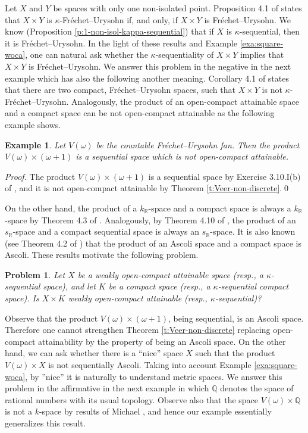 \documentclass[preprint,11pt]{elsarticle}
\newtheorem{example}[theorem]{Example}
\newtheorem{problem}[theorem]{Problem}
\numberwithin{equation}{section}
\numberwithin{theorem}{section}
\newcommand{\w}{\omega}
\newcommand{\IR}{\mathbb{R}}
\begin{document}
Let $X$ and $Y$ be spaces with only one non-isolated point. Proposition 4.1 of \cite{LiL} states that $X\times Y$ is $\kappa$-Fr\'{e}chet--Urysohn if, and only, if $X\times Y$ is Fr\'{e}chet--Urysohn. We know (Proposition \ref{p:1-non-isol-kappa-sequential}) that if $X$ is $\kappa$-sequential, then it is Fr\'{e}chet--Urysohn. In the light of these results and Example \ref{exa:square-woca}, one can natural ask whether the $\kappa$-sequentiality of $X\times Y$ implies that $X\times Y$ is Fr\'{e}chet--Urysohn. We answer this problem in the negative in the next example which has also the following another meaning. Corollary 4.1 of \cite{LiL} states that there are two compact,  Fr\'{e}chet--Urysohn spaces, such that $X\times Y$ is not $\kappa$-Fr\'{e}chet--Urysohn.
Analogously, the product of an open-compact attainable space and a compact space can be not open-compact attainable as the following example shows.

\begin{example} \label{exa:product-V-S-non-oca}
Let $V(\w)$ be the countable Fr\'{e}chet--Urysohn fan. Then the product $V(\w)\times (\w+1)$ is a sequential space which is not open-compact attainable.
\end{example}

\begin{proof}
The product $V(\w)\times (\w+1)$ is a sequential space by Exercise 3.10.I(b) of \cite{Eng}, and it is  not open-compact attainable by Theorem \ref{t:Veer-non-discrete}.\qed
\end{proof}

On the other hand, the product of a $k_\IR$-space and a compact space is always a $k_\IR$-space by Theorem 4.3 of \cite{GR-prod}. Analogously, by Theorem 4.10 of \cite{GR-prod}, the product of an $s_\IR$-space and a compact sequential space is always an $s_\IR$-space. It is also known (see Theorem 4.2 of \cite{Gabr-seq-Ascoli}) that the product of an Ascoli space and a compact space is Ascoli. These results motivate the following problem.

\begin{problem}
Let $X$ be a weakly open-compact attainable space (resp., a $\kappa$-sequential space), and let $K$ be a compact space (resp., a $\kappa$-sequential compact space). Is $X\times K$  weakly open-compact attainable  (resp., $\kappa$-sequential)?
\end{problem}



Observe that the product $V(\w)\times (\w+1)$, being sequential, is an Ascoli space. Therefore one cannot strengthen Theorem \ref{t:Veer-non-discrete} replacing open-compact attainability by the property of being an Ascoli space. On the other hand, we can ask whether there is a ``nice'' space $X$ such that the product $V(\w)\times X$ is not sequentially Ascoli. Taking into account Example \ref{exa:square-woca}, by ''nice'' it is naturally to understand metric spaces. We answer this problem in the affirmative in the next example in which $\mathbb{Q}$ denotes the space of rational numbers with its usual topology. Observe also that the space $V(\w)\times \mathbb{Q}$ is not a $k$-space by results of Michael \cite{Michael-68}, and hence  our example essentially generalizes this result.
\end{document}

